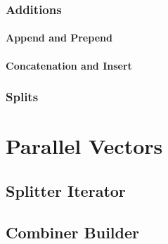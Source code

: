 

\subsubsection{Additions}

\paragraph{Append and Prepend}

\paragraph{Concatenation and Insert}



\subsubsection{Splits}



\section{Parallel Vectors}


\subsection{Splitter Iterator}



\subsection{Combiner Builder}



